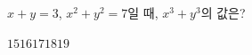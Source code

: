 $x+y=3$, $x^2+y^2=7$일 때, $x^3+y^3$의 값은?
\begin{choices32}{$15$}{$16$}{$17$}{$18$}{$19$}\end{choices32}
